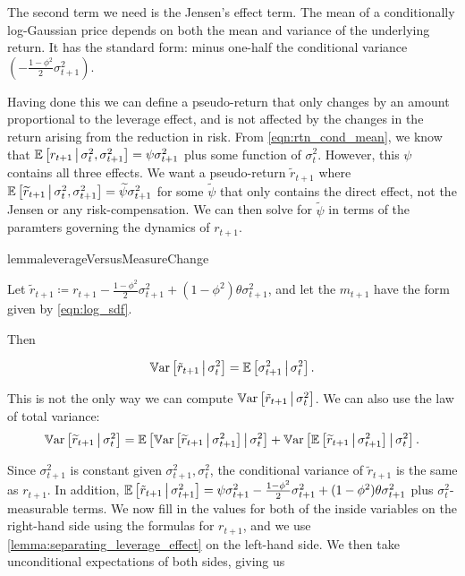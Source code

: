 \documentclass[11pt, letterpaper, twoside]{article}
\begin{document}
The second term we need is the Jensen's effect term. The mean of a conditionally log-Gaussian price depends on both the mean and variance of the underlying return. It has the standard form: minus one-half the conditional variance $\left(-\frac{1 - \phi^2}{2} \sigma^2_{t+1}\right)$. 

Having done this we can define a pseudo-return that only changes by an amount proportional to the leverage effect, and is not affected by the changes in the return arising from the reduction in risk. From \cref{eqn:rtn_cond_mean}, we know that $\operatorname{\mathbb{E}}\left[r_{t+1} \,\middle\vert\, \sigma^2_t, \sigma^2_{t+1} \right] = \psi \sigma^2_{t+1}$ plus some function of $\sigma^2_t$. However, this $\psi$ contains all three effects. We want a pseudo-return $\widetilde{r}_{t+1}$ where $\operatorname{\mathbb{E}}\left[\widetilde{r}_{t+1} \,\middle\vert\, \sigma^2_t, \sigma^2_{t+1} \right] = \widetilde{\psi} \sigma^2_{t+1}$ for some $\widetilde{\psi}$ that only contains the direct effect, not the Jensen or any risk-compensation. We can then solve for $\widetilde{\psi}$ in terms of the paramters governing the dynamics of $r_{t+1}$.

\begin{restatable}{lemma}{leverageVersusMeasureChange}
 \label{lemma:separating_leverage_effect}

 Let $\tilde{r}_{t+1} \coloneqq r_{t+1} - \frac{1 - \phi^2}{2} \sigma^2_{t+1} + (1 - \phi^2) \theta
 \sigma^2_{t+1}$, and let the $m_{t+1}$ have the form given by \cref{eqn:log_sdf}.
 
 Then 
 
 \begin{equation}
  \operatorname{\mathbb{V}ar}\left[\tilde{r}_{t+1} \,\middle\vert\, \sigma^2_t \right] = \operatorname{\mathbb{E}}\left[\sigma^2_{t+1} \,\middle\vert\, \sigma^2_t\right].
 \end{equation}
\end{restatable}
%
This is not the only way we can compute $\operatorname{\mathbb{V}ar}\left[\tilde{r}_{t+1} \,\middle\vert\, \sigma^2_t \right]$.
We can also use the law of total variance:
%
 \begin{equation}
 \operatorname{\mathbb{V}ar}\left[\widetilde{r}_{t+1} \,\middle\vert\, \sigma^2_t\right] =
 \operatorname{\mathbb{E}}\left[\operatorname{\mathbb{V}ar}\left[\widetilde{r}_{t+1} \,\middle\vert\, \sigma^2_{t+1}\right] \,\middle\vert\, \sigma_t^2 \right] +
 \operatorname{\mathbb{V}ar}\left[\operatorname{\mathbb{E}}\left[\widetilde{r}_{t+1}\,\middle\vert\, \sigma_{t+1}^2\right] \,\middle\vert\, \sigma^2_t\right].
\end{equation}

Since $\sigma^2_{t+1}$ is constant given $\sigma^2_{t+1}, \sigma^2_t$, the conditional variance of $\widetilde{r}_{t+1}$ is the same as $r_{t+1}$. In addition, $\operatorname{\mathbb{E}}\left[\tilde{r}_{t+1} \,\middle\vert\, \sigma^2_{t+1}\right] = \psi \sigma^2_{t+1} - \frac{1-\phi^2}{2} \sigma^2_{t+1} + (1- \phi^2) \theta \sigma^2_{t+1}$ plus $\sigma^2_t$-measurable terms. We now fill in the values for both of the inside variables on the right-hand side using the formulas for $r_{t+1}$, and we use \cref{lemma:separating_leverage_effect} on the left-hand side. We then take unconditional expectations of both sides, giving us
\end{document}
